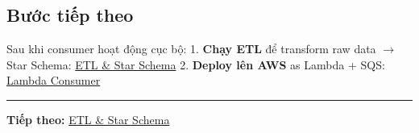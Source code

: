 \hypertarget{bux1b0ux1edbc-tiux1ebfp-theo}{%
\subsection{Bước tiếp theo}}

Sau khi consumer hoạt động cục bộ: 1. \textbf{Chạy ETL} để transform raw
data \(\rightarrow\) Star Schema: \href{5.7-ETL/}{ETL \& Star Schema} 2.
\textbf{Deploy lên AWS} as Lambda + SQS:
\href{5.11-Lambda-Consumer/}{Lambda Consumer}

\begin{center}\rule{0.5\linewidth}{0.5pt}\end{center}

\textbf{Tiếp theo:} \href{5.7-ETL/}{ETL \& Star Schema}
